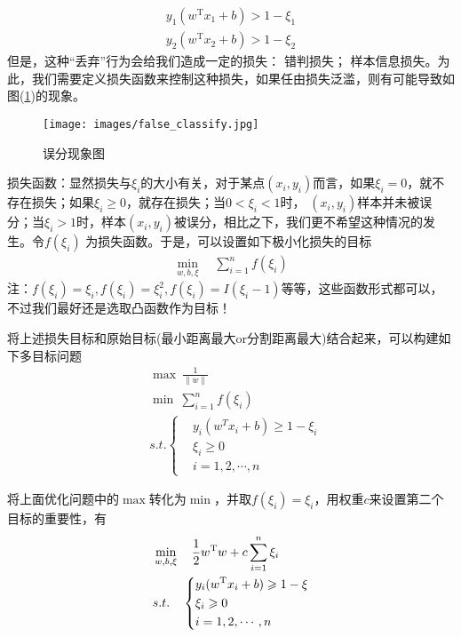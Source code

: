 	\begin{align*}
	y_1(w^\mathrm{T}x_1+b)>1-\xi_1\\
	y_2(w^\mathrm{T}x_2+b)>1-\xi_2
	\end{align*}
	但是，这种“丢弃”行为会给我们造成一定的损失： 错判损失； 样本信息损失。为此，我们需要定义损失函数来控制这种损失，如果任由损失泛滥，则有可能导致如图(\ref{fig:误分现象图})的现象。\\
		\begin{figure}[H]
		\centering
		\texttt{[image: images/false\_classify.jpg]}
		\caption{误分现象图}
		\label{fig:误分现象图}
		\end{figure}
	\par
	损失函数：显然损失与$\xi_i$的大小有关，对于某点$(x_i,y_i)$而言，如果$\xi_i=0$，就不存在损失；如果$\xi_i \geqslant 0$，就存在损失；当$0<\xi_i<1$时，
	$(x_i,y_i)$样本并未被误分；当$\xi_i>1$时，样本$(x_i,y_i)$被误分，相比之下，我们更不希望这种情况的发生。令$f(\xi_i)$ 为损失函数。于是，可以设置如下极小化损失的目标
	\begin{align*}
	\min_{w,b,\xi}\quad\sum_{i=1}^n f(\xi_i)
	\end{align*}
	注：$f(\xi_i)=\xi_i,f(\xi_i)=\xi_i^2,f(\xi_i)=I(\xi_i-1)$等等，这些函数形式都可以，不过我们最好还是选取凸函数作为目标！
	\par
	将上述损失目标和原始目标(最小距离最大or分割距离最大)结合起来，可以构建如下多目标问题
	\begin{align*}
	& \max\ {\frac{1}{\left\| w \right\|}} \\
	& \min\ {\sum_{i=1}^{n}f(\xi_i)} \\
	& s.t. \left\{
	\begin{aligned}
	& y_i(w^T x_i + b) \geqslant 1 - \xi_i \\
	& \xi_i \geqslant 0 \\
	& i = 1, 2, \cdots, n
	\end{aligned}
	\right.
	\end{align*}
	\par
	将上面优化问题中的$\max$转化为$\min$，并取$f(\xi_i)=\xi_i$，用权重$c$来设置第二个目标的重要性，有
	\begin{align}
	\label{eq:容错支持向量机}
	& \min_{w,b,\xi} \quad \frac{1}{2} w^\mathrm{T} w + c \sum_{i=1}^{n} \xi_i \\
	& s.t. \quad \left\{
		\begin{aligned}
		& y_i(w^\mathrm{T} x_i + b) \geqslant 1 - \xi \notag\\
		& \xi_i \geqslant 0 \notag\\
		& i = 1,2,\cdots,n \notag\\
		\end{aligned}
	\right.
	\end{align}
